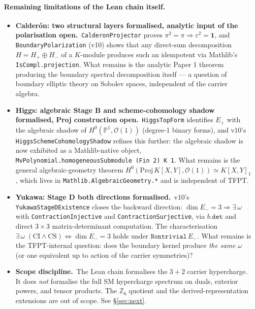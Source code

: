\documentclass[11pt,a4paper]{article}
\begin{document}
\paragraph{Remaining limitations of the Lean chain itself.}
\begin{itemize}[leftmargin=1.6em, itemsep=1pt]
\item \textbf{Calder\'on: two structural layers formalised,
    analytic input of the polarisation open.}\
    \texttt{CalderonProjector} proves $\pi^2 = \pi
    \Rightarrow \varepsilon^2 = \mathbf 1$, and
    \texttt{BoundaryPolarization} (v10) shows that any
    direct-sum decomposition $H = H_+ \oplus H_-$ of a
    $K$-module produces such an idempotent via Mathlib's
    \texttt{IsCompl.projection}. What remains is the analytic
    Paper 1 theorem producing the boundary spectral
    decomposition itself --- a question of boundary elliptic
    theory on Sobolev spaces, independent of the carrier
    algebra.
\item \textbf{Higgs: algebraic Stage B and scheme-cohomology
    shadow formalised, Proj construction open.}\
    \texttt{HiggsTopForm} identifies $E_+$ with the algebraic
    shadow of $H^0(\mathbb P^1, \mathcal O(1))$ (degree-1 binary
    forms), and v10's \texttt{HiggsSchemeCohomologyShadow}
    refines this further: the algebraic shadow is now exhibited
    as a Mathlib-native object,
    \texttt{MvPolynomial.homogeneousSubmodule (Fin 2) K 1}.
    What remains is the general algebraic-geometry theorem
    $H^0(\mathrm{Proj}\,K[X,Y], \mathcal O(1)) \simeq K[X, Y]_1$,
    which lives in \texttt{Mathlib.AlgebraicGeometry.*} and is
    independent of TFPT.
\item \textbf{Yukawa: Stage D both directions formalised.}\
    v10's \texttt{YukawaStageDExistence} closes the backward
    direction:
    $\dim E_- = 3 \Rightarrow \exists\,\omega$ with
    \texttt{ContractionInjective} and
    \texttt{ContractionSurjective}, via $b.\texttt{det}$ and
    direct $3{\times}3$ matrix-determinant computation. The
    characterisation
    $\exists\,\omega\;(\textrm{CI} \wedge \textrm{CS})
      \iff \dim E_- = 3$ holds under
    $\texttt{Nontrivial}\,E_-$. What remains is the
    TFPT-internal question: does the boundary kernel produce
    \emph{the same} $\omega$ (or one equivalent up to action of
    the carrier symmetries)?
\item \textbf{Scope discipline.}\ The Lean chain formalises the
    $3+2$ carrier hypercharge. It does \emph{not} formalise the
    full SM hypercharge spectrum on duals, exterior powers, and
    tensor products. The $\mathbb Z_6$ quotient and the
    derived-representation extensions are out of scope. See
    \S\ref{sec:next}.
\end{itemize}
\end{document}
